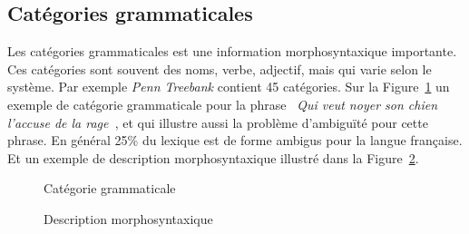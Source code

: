 \subsection{Catégories grammaticales}
Les catégories grammaticales est une information morphosyntaxique importante. Ces catégories sont souvent des noms, verbe, adjectif, mais qui varie selon le système. Par exemple \textit{Penn Treebank} contient 45 catégories. Sur la Figure~\ref{fig:categorie-grammaticale} un exemple de catégorie grammaticale pour la phrase \textit{\og~Qui veut noyer son chien l’accuse de la rage~\fg{}}, et qui illustre aussi la problème d’ambiguïté pour cette phrase. En général 25\% du lexique est de forme ambigus pour la langue française. Et un exemple de description morphosyntaxique illustré dans la Figure~\ref{fig:exemple-desc-morphosyntaxique}.

\begin{figure}[htbp]
    \begin{center}
    \end{center}
    \caption{Catégorie grammaticale \citep{handbook-nlp}}\label{fig:categorie-grammaticale}
\end{figure}

\begin{figure}[htbp]
    \begin{center}
    \end{center}
    \caption{Description morphosyntaxique \citep{handbook-nlp}}\label{fig:exemple-desc-morphosyntaxique}
\end{figure}

